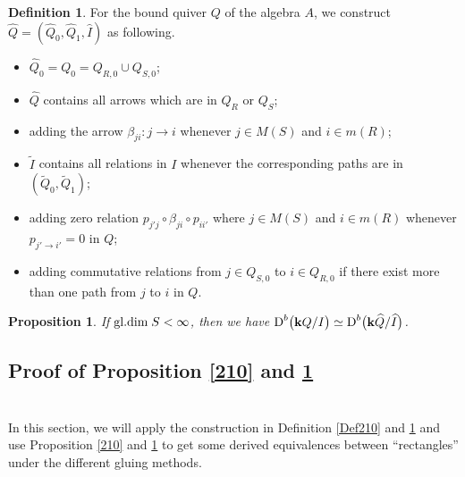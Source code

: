 \documentclass[a4paper, reqno]{amsart}
\newtheorem{prop}[thm]{Proposition}
\theoremstyle{definition}
\newtheorem{defn}[thm]{Definition}
\theoremstyle{remark}
\numberwithin{equation}{section}
\begin{document}
\begin{defn}\label{Def211}
For the bound quiver $Q$ of the algebra $A$, we construct $\widehat{Q}=(\widehat{Q}_0,\widehat{Q}_1,\widehat{I})$ as following.
\begin{itemize}
    \item $\widehat{Q}_0=Q_0=Q_{R,0}\cup Q_{S,0}$;
    \item $\widehat{Q}$ contains all arrows which are in $Q_R$ or $Q_S$;
    \item adding the arrow $\beta_{ji} : j\to i$ whenever $j\in M(S)$ and $i\in m(R)$;
    \item $\tilde{I}$ contains all relations in $I$ whenever the corresponding paths are in $(\tilde{Q}_0,\tilde{Q}_1)$;
    \item {\color{blue}adding zero relation $p_{j'j}\circ \beta_{ji}\circ p_{ii'}$ where $j\in M(S)$ and $i\in m(R)$ whenever $p_{j'\to i'}=0$ in $Q$;}
    \item adding commutative relations from $j\in Q_{S,0}$ to $i\in Q_{R,0}$ if there exist more than one path from $j$ to $i$ in $Q$.
\end{itemize}
\end{defn}

\begin{prop}\label{211}
If  $\textup{gl.dim}\;S<\infty$, then we have  $\textup{D}^b\big({\bf k} Q/I\big)\simeq \textup{D}^b\big({\bf k} \widehat{Q}/\widehat{I}\big)$.  
\end{prop}

\subsection{Proof of Proposition \ref{210} and \ref{211}}

\section{}\label{Sect3}

In this section, we will apply the construction in Definition \ref{Def210} and \ref{Def211} and use Proposition \ref{210} and \ref{211} to get some derived equivalences between ``rectangles'' under the different gluing methods.
\end{document}
